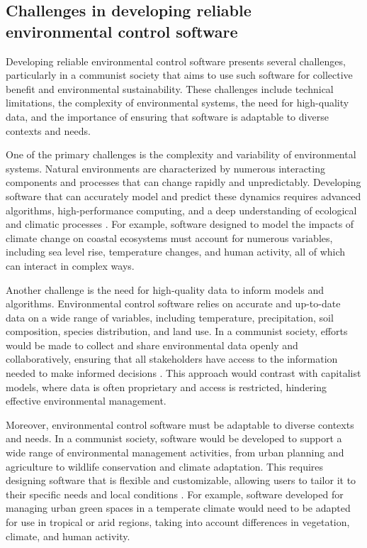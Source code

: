 \subsection{Challenges in developing reliable environmental control software}

Developing reliable environmental control software presents several challenges, particularly in a communist society that aims to use such software for collective benefit and environmental sustainability. These challenges include technical limitations, the complexity of environmental systems, the need for high-quality data, and the importance of ensuring that software is adaptable to diverse contexts and needs.

One of the primary challenges is the complexity and variability of environmental systems. Natural environments are characterized by numerous interacting components and processes that can change rapidly and unpredictably. Developing software that can accurately model and predict these dynamics requires advanced algorithms, high-performance computing, and a deep understanding of ecological and climatic processes \cite[pp.~150-158]{beven2012rainfall}. For example, software designed to model the impacts of climate change on coastal ecosystems must account for numerous variables, including sea level rise, temperature changes, and human activity, all of which can interact in complex ways.

Another challenge is the need for high-quality data to inform models and algorithms. Environmental control software relies on accurate and up-to-date data on a wide range of variables, including temperature, precipitation, soil composition, species distribution, and land use. In a communist society, efforts would be made to collect and share environmental data openly and collaboratively, ensuring that all stakeholders have access to the information needed to make informed decisions \cite[pp.~88-95]{peters2012data}. This approach would contrast with capitalist models, where data is often proprietary and access is restricted, hindering effective environmental management.

Moreover, environmental control software must be adaptable to diverse contexts and needs. In a communist society, software would be developed to support a wide range of environmental management activities, from urban planning and agriculture to wildlife conservation and climate adaptation. This requires designing software that is flexible and customizable, allowing users to tailor it to their specific needs and local conditions \cite[pp.~175-182]{gurney2008adaptation}. For example, software developed for managing urban green spaces in a temperate climate would need to be adapted for use in tropical or arid regions, taking into account differences in vegetation, climate, and human activity.

